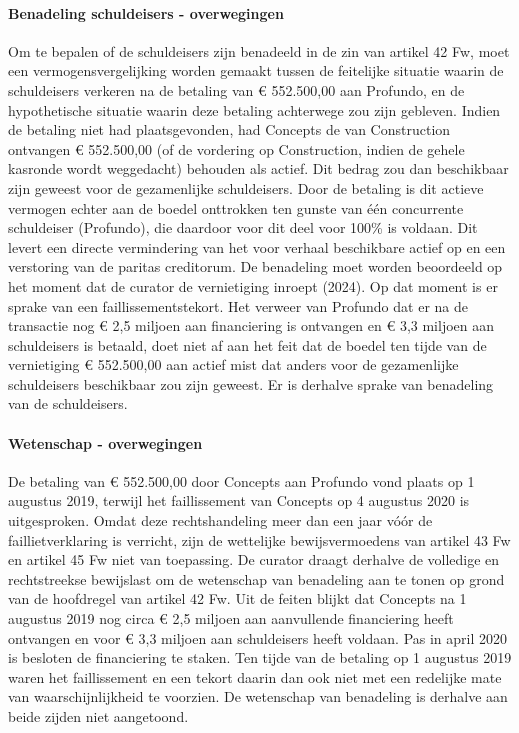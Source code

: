 \documentclass[
  dutch,
  a4paper,
]{article}
\begin{document}
\paragraph{Benadeling schuldeisers - overwegingen}\label{benadeling-schuldeisers---overwegingen-41}

Om te bepalen of de schuldeisers zijn benadeeld in de zin van artikel 42 Fw, moet een vermogensvergelijking worden gemaakt tussen de feitelijke situatie waarin de schuldeisers verkeren na de betaling van € 552.500,00 aan Profundo, en de hypothetische situatie waarin deze betaling achterwege zou zijn gebleven. Indien de betaling niet had plaatsgevonden, had Concepts de van Construction ontvangen € 552.500,00 (of de vordering op Construction, indien de gehele kasronde wordt weggedacht) behouden als actief. Dit bedrag zou dan beschikbaar zijn geweest voor de gezamenlijke schuldeisers. Door de betaling is dit actieve vermogen echter aan de boedel onttrokken ten gunste van één concurrente schuldeiser (Profundo), die daardoor voor dit deel voor 100\% is voldaan. Dit levert een directe vermindering van het voor verhaal beschikbare actief op en een verstoring van de paritas creditorum. De benadeling moet worden beoordeeld op het moment dat de curator de vernietiging inroept (2024). Op dat moment is er sprake van een faillissementstekort. Het verweer van Profundo dat er na de transactie nog € 2,5 miljoen aan financiering is ontvangen en € 3,3 miljoen aan schuldeisers is betaald, doet niet af aan het feit dat de boedel ten tijde van de vernietiging € 552.500,00 aan actief mist dat anders voor de gezamenlijke schuldeisers beschikbaar zou zijn geweest. Er is derhalve sprake van benadeling van de schuldeisers.

\paragraph{Wetenschap - overwegingen}\label{wetenschap---overwegingen-41}

De betaling van € 552.500,00 door Concepts aan Profundo vond plaats op 1 augustus 2019, terwijl het faillissement van Concepts op 4 augustus 2020 is uitgesproken. Omdat deze rechtshandeling meer dan een jaar vóór de faillietverklaring is verricht, zijn de wettelijke bewijsvermoedens van artikel 43 Fw en artikel 45 Fw niet van toepassing. De curator draagt derhalve de volledige en rechtstreekse bewijslast om de wetenschap van benadeling aan te tonen op grond van de hoofdregel van artikel 42 Fw. Uit de feiten blijkt dat Concepts na 1 augustus 2019 nog circa € 2,5 miljoen aan aanvullende financiering heeft ontvangen en voor € 3,3 miljoen aan schuldeisers heeft voldaan. Pas in april 2020 is besloten de financiering te staken. Ten tijde van de betaling op 1 augustus 2019 waren het faillissement en een tekort daarin dan ook niet met een redelijke mate van waarschijnlijkheid te voorzien. De wetenschap van benadeling is derhalve aan beide zijden niet aangetoond.
\end{document}
